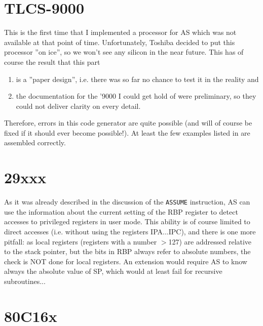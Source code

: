 \documentclass[12pt,twoside]{report}
\newcommand{\tty}[1]{{\tt #1}}
\begin{document}

\section{TLCS-9000}

This is the first time that I implemented a processor for AS which
was not available at that point of time.  Unfortunately, Toshiba
decided to put this processor ''on ice'', so we won't see any silicon
in the near future.  This has of course the result that this part
\begin{enumerate}
\item{is a ''paper design'', i.e. there was so far no chance to test
     it in the reality and}
\item{the documentation for the '9000 I could get hold of \cite{Tosh9000}
      were preliminary, so they could not deliver clarity on every
      detail.}
\end{enumerate}
Therefore, errors in this code generator are quite possible (and will
of course be fixed if it should ever become possible!).  At least the
few examples listed in \cite{Tosh9000} are assembled correctly.


\section{29xxx}

As it was already described in the discussion of the \tty{ASSUME}
instruction, AS can use the information about the current setting of
the RBP register to detect accesses to privileged registers in user
mode.  This ability is of course limited to direct accesses (i.e.
without using the registers IPA...IPC), and there is one more
pitfall: as local registers (registers with a number $>$127) are
addressed relative to the stack pointer, but the bits in RBP always
refer to absolute numbers, the check is NOT done for local registers. 
An extension would require AS to know always the absolute value of
SP, which would at least fail for recursive subroutines...

   
\section{80C16x}
\end{document}
